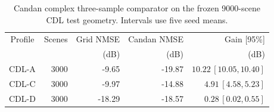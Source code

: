 \begin{table}[!ht]
\centering
\caption{Candan complex three-sample comparator on the frozen 9000-scene CDL test geometry. Intervals use five seed means.}
\label{tab:supp_candan_cdl}
\footnotesize
\begin{tabular}{crrrr}
\toprule
Profile & Scenes & Grid NMSE & Candan NMSE & Gain [95\%] \\
 & & (dB) & (dB) & (dB) \\
\midrule
CDL-A & 3000 & -9.65 & -19.87 & $10.22\,[10.05,10.40]$ \\
CDL-C & 3000 & -9.97 & -14.88 & $4.91\,[4.58,5.23]$ \\
CDL-D & 3000 & -18.29 & -18.57 & $0.28\,[0.02,0.55]$ \\
\bottomrule
\end{tabular}
\end{table}
